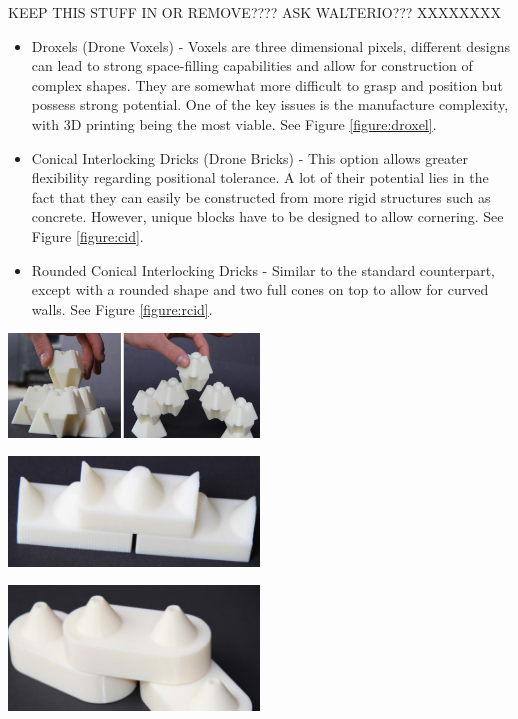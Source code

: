 \documentclass[11pt]{article}
\begin{document}
KEEP THIS STUFF IN OR REMOVE???? ASK WALTERIO??? XXXXXXXX

\begin{itemize}
\item{Droxels (Drone Voxels) - Voxels are three dimensional pixels, different designs can lead to strong space-filling capabilities and allow for construction of complex shapes. They are somewhat more difficult to grasp and position but possess strong potential. One of the key issues is the manufacture complexity, with 3D printing being the most viable. See Figure \ref{figure:droxel}.}
\item{Conical Interlocking Dricks (Drone Bricks) - This option allows greater flexibility regarding positional tolerance. A lot of their potential lies in the fact that they can easily be constructed from more rigid structures such as concrete. However, unique blocks have to be designed to allow cornering. See Figure \ref{figure:cid}.}
\item{Rounded Conical Interlocking Dricks - Similar to the standard counterpart, except with a rounded shape and two full cones on top to allow for curved walls. See Figure \ref{figure:rcid}.}
\end{itemize}



\begin{center}
\includegraphics[width = 0.5\textwidth]{droxel.png}
\label{figure:droxel}

\includegraphics[width = 0.5\textwidth]{cid.png}
\label{figure:cid}

\includegraphics[width = 0.5\textwidth]{rcid.png}
\label{figure:rcid}

\end{center}
\end{document}
